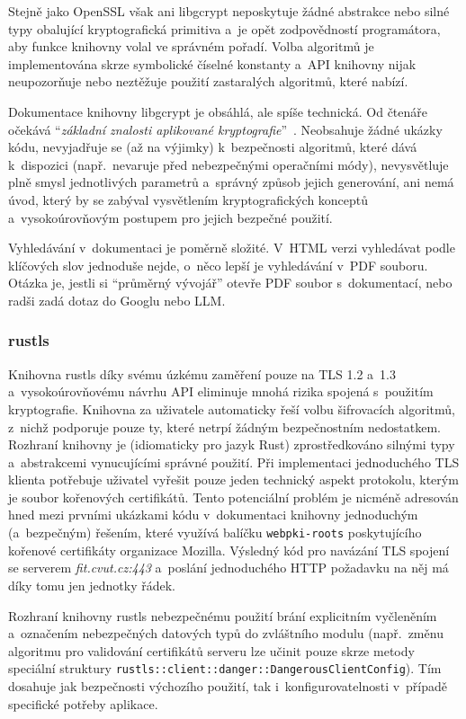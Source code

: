 Stejně jako OpenSSL však ani libgcrypt neposkytuje žádné abstrakce nebo silné typy obalující kryptografická primitiva a~je opět zodpovědností programátora, aby funkce knihovny volal ve správném pořadí. Volba algoritmů je implementována skrze symbolické číselné konstanty a~API knihovny nijak neupozorňuje nebo neztěžuje použití zastaralých algoritmů, které nabízí.

Dokumentace knihovny libgcrypt je obsáhlá, ale spíše technická. Od čtenáře očekává ``\textit{základní znalosti aplikované kryptografie}''~\cite{gcrypt-getting-started}. Neobsahuje žádné ukázky kódu, nevyjadřuje se (až na výjimky) k~bezpečnosti algoritmů, které dává k~dispozici (např.\ nevaruje před nebezpečnými ope\-rač\-ní\-mi módy), nevysvětluje plně smysl jednotlivých parametrů a~správný způsob jejich generování, ani nemá úvod, který by se zabýval vysvětlením kryptografických konceptů a~vysokoúrovňovým postupem pro jejich bezpečné použití.

Vyhledávání v~dokumentaci je poměrně složité. V~HTML verzi vyhledávat podle klíčových slov jednoduše nejde, o~něco lepší je vyhledávání v~PDF souboru. Otázka je, jestli si ``průměrný vývojář'' otevře PDF soubor s~dokumentací, nebo radši zadá dotaz do Googlu nebo LLM.

\subsubsection*{rustls}

Knihovna rustls díky svému úzkému zaměření pouze na TLS 1.2 a~1.3 a~vysokoúrovňovému návrhu API eliminuje mnohá rizika spojená s~použitím kryptografie. Knihovna za uživatele automaticky řeší volbu šifrovacích algoritmů, z~nichž podporuje pouze ty, které netrpí žádným bezpečnostním nedostatkem. Rozhraní knihovny je (idiomaticky pro jazyk Rust) zprostředkováno silnými typy a~abstrakcemi vynucujícími správné použití. Při implementaci jednoduchého TLS klienta potřebuje uživatel vyřešit pouze jeden technický aspekt protokolu, kterým je soubor kořenových certifikátů. Tento potenciální problém je nicméně adresován hned mezi prvními ukázkami kódu v~dokumentaci knihovny jednoduchým (a~bezpečným) řešením, které využívá balíčku \texttt{webpki-roots} poskytujícího kořenové certifikáty organizace Mozilla. Výsledný kód pro navázání TLS spojení se serverem \textit{fit.cvut.cz:443} a~poslání jednoduchého HTTP požadavku na něj má díky tomu jen jednotky řádek.

Rozhraní knihovny rustls nebezpečnému použití brání explicitním vyčleněním a~označením nebezpečných datových typů do zvláštního modulu (např.\ změnu algoritmu pro validování certifikátů serveru lze učinit pouze skrze metody speciální struktury \texttt{rustls::\allowbreak client::\allowbreak danger::\allowbreak DangerousClientConfig}). Tím dosahuje jak bezpečnosti výchozího použití, tak i~konfigurovatelnosti v~případě specifické potřeby aplikace.

